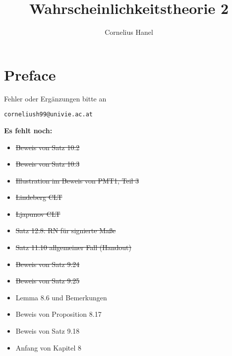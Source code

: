 \documentclass[11pt]{report}
\title{Wahrscheinlichkeitstheorie 2}
\author{Cornelius Hanel}
\begin{document}
\maketitle

\chapter*{Preface}
Fehler oder Erg\"anzungen bitte an
\newline
\begin{center}
    \texttt{corneliush99@univie.ac.at}
\end{center}

\textbf{Es fehlt noch:}
\begin{multicols}{2}
\begin{itemize}
    \item \sout{Beweis von Satz 10.2} \checkmark
    \item \sout{Beweis von Satz 10.3} \checkmark
    \item \sout{Illustration im Beweis von PMT1, Teil 3} \checkmark 
    \item \sout{Lindeberg CLT} \checkmark
    \item \sout{Ljapunov CLT} \checkmark
    \item \sout{Satz 12.8: R\textendash N f\"ur signierte Ma\ss{}e} \checkmark
    \item \sout{Satz 11.10 allgemeiner Fall (Handout)} \checkmark
    \item \sout{Beweis von Satz 9.24} \checkmark
    \item \sout{Beweis von Satz 9.25} \checkmark
    \item Lemma 8.6 und Bemerkungen
    \item Beweis von Proposition 8.17
    \item Beweis von Satz 9.18
    \item Anfang von Kapitel 8
\end{itemize}
\end{multicols}

\tableofcontents

\end{document}
